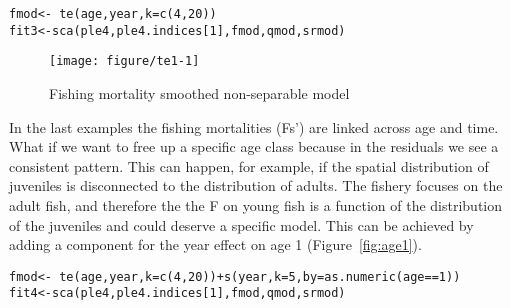 \documentclass[a4paper,english,10pt]{article}\usepackage[]{graphicx}\usepackage[]{color}
\makeatletter
\def\maxwidth{ %
  \ifdim\Gin@nat@width>\linewidth
    \linewidth
  \else
    \Gin@nat@width
  \fi
}
\newcommand{\hlnum}[1]{\textcolor[rgb]{0.2,0.2,0.2}{#1}}%
\newcommand{\hlopt}[1]{\textcolor[rgb]{0.2,0.2,0.2}{#1}}%
\newcommand{\hlstd}[1]{\textcolor[rgb]{0,0,0}{#1}}%
\newcommand{\hlkwb}[1]{\textcolor[rgb]{0.361,0.506,0.596}{#1}}%
\newcommand{\hlkwc}[1]{\textcolor[rgb]{0.361,0.506,0.596}{#1}}%
\newcommand{\hlkwd}[1]{\textcolor[rgb]{0.361,0.506,0.596}{#1}}%
\newenvironment{kframe}{%
 \def\at@end@of@kframe{}%
 \ifinner\ifhmode%
  \def\at@end@of@kframe{\end{minipage}}%
  \begin{minipage}{\columnwidth}%
 \fi\fi%
 \def\FrameCommand##1{\hskip\@totalleftmargin \hskip-\fboxsep
 \colorbox{shadecolor}{##1}\hskip-\fboxsep
     \hskip-\linewidth \hskip-\@totalleftmargin \hskip\columnwidth}%
 \MakeFramed {\advance\hsize-\width
   \@totalleftmargin\z@ \linewidth\hsize
   \@setminipage}}%
 {\par\unskip\endMakeFramed%
 \at@end@of@kframe}
\newenvironment{knitrout}{}{} %
\makeatother
\begin{document}
\begin{knitrout}
\color{fgcolor}\begin{kframe}
\begin{alltt}
\hlstd{fmod} \hlkwb{<-} \hlopt{~} \hlkwd{te}\hlstd{(age, year,} \hlkwc{k} \hlstd{=} \hlkwd{c}\hlstd{(}\hlnum{4}\hlstd{,}\hlnum{20}\hlstd{))}
\hlstd{fit3} \hlkwb{<-} \hlkwd{sca}\hlstd{(ple4, ple4.indices[}\hlnum{1}\hlstd{], fmod, qmod, srmod)}
\end{alltt}
\end{kframe}
\end{knitrout}

\begin{knitrout}
\color{fgcolor}\begin{figure}[H]

{\centering \texttt{[image: figure/te1-1]} 

}

\caption[Fishing mortality smoothed non-separable model]{Fishing mortality smoothed non-separable model\label{fig:te1}}
\end{figure}


\end{knitrout}

In the last examples the fishing mortalities (Fs') are linked across age and time.  What if we want to free up a specific age class because in the residuals we see a consistent pattern.  This can happen, for example, if the spatial distribution of juveniles is disconnected to the distribution of adults.  The fishery focuses on the adult fish, and therefore the the F on young fish is a function of the distribution of the juveniles and could deserve a specific model. This can be achieved by adding a component for the year effect on age 1 (Figure~\ref{fig:age1}).

\begin{knitrout}
\color{fgcolor}\begin{kframe}
\begin{alltt}
\hlstd{fmod} \hlkwb{<-} \hlopt{~} \hlkwd{te}\hlstd{(age, year,} \hlkwc{k} \hlstd{=} \hlkwd{c}\hlstd{(}\hlnum{4}\hlstd{,}\hlnum{20}\hlstd{))} \hlopt{+} \hlkwd{s}\hlstd{(year,} \hlkwc{k} \hlstd{=} \hlnum{5}\hlstd{,} \hlkwc{by} \hlstd{=} \hlkwd{as.numeric}\hlstd{(age}\hlopt{==}\hlnum{1}\hlstd{))}
\hlstd{fit4} \hlkwb{<-} \hlkwd{sca}\hlstd{(ple4, ple4.indices[}\hlnum{1}\hlstd{], fmod, qmod, srmod)}
\end{alltt}
\end{kframe}
\end{knitrout}
\end{document}
